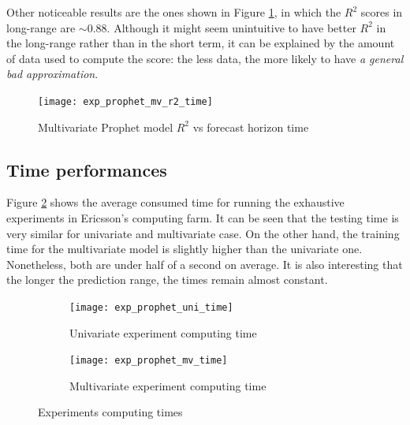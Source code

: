 
Other noticeable results are the ones shown in Figure \ref{fig:exp_prophet_mv_r2}, in which the $R^2$ scores in long-range are $\sim0.88$. Although it might seem unintuitive to have better $R^2$ in the long-range rather than in the short term, it can be explained by the amount of data used to compute the score: the less data, the more likely to have \emph{a general bad approximation}. 

\begin{figure}[H]
	\centering
	\texttt{[image: exp\_prophet\_mv\_r2\_time]}
	\caption{Multivariate Prophet model $R^2$ vs forecast horizon time}
	\label{fig:exp_prophet_mv_r2}
\end{figure}

\subsection{Time performances}

Figure \ref{fig:time-perfs} shows the average consumed time for running the exhaustive experiments in Ericsson's computing farm. It can be seen that the testing time is very similar for univariate and multivariate case. On the other hand, the training time for the multivariate model is slightly higher than the univariate one. Nonetheless, both are under half of a second on average. It is also interesting that the longer the prediction range, the times remain almost constant.

\begin{figure}[H]
	\centering
	\begin{subfigure}{0.49\linewidth}
		\texttt{[image: exp\_prophet\_uni\_time]}
		\caption{Univariate experiment computing time}
	\end{subfigure}
	\hfill
	\begin{subfigure}{0.49\linewidth}
		\texttt{[image: exp\_prophet\_mv\_time]}
		\caption{Multivariate experiment computing time}
	\end{subfigure}
	\caption{Experiments computing times}
	\label{fig:time-perfs}
\end{figure}



